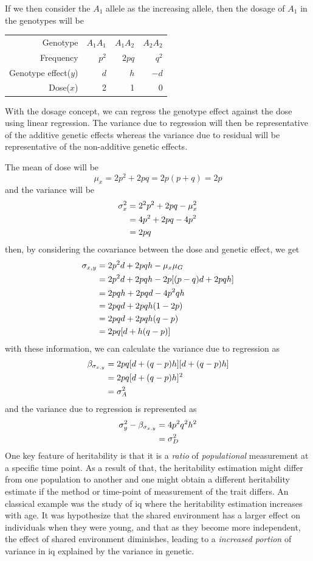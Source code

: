 \documentclass{book}
\begin{document}
	If we then consider the $A_1$ allele as the increasing allele, then the dosage of $A_1$ in the genotypes will be
	\begin{table}[H]
		\centering
		\begin{tabular}{rrrr}
			Genotype &$A_1A_1$&	$A_1A_2$&$A_2A_2$\\
			Frequency& $p^2$&$2pq$&$q^2$\\
			Genotype effect($y$)& $d$&$h$&$-d$\\
			Dose($x$)& 2 & 1 & 0
		\end{tabular}
	\end{table} 
	With the dosage concept, we can regress the genotype effect against the dose using linear regression.
	The variance due to regression will then be representative of the additive genetic effects whereas the variance due to residual will be representative of the non-additive genetic effects.
	
	The mean of dose will be
	$$
	\mu_x = 2p^2+2pq = 2p(p+q)=2p 
	$$	
	and the variance will be
	\begin{align}
	\sigma_x^2&=2^2p^2+2pq-\mu_x^2\notag\\
	&=4p^2+2pq-4p^2\notag\\
	&=2pq
	\end{align}
	then, by considering the covariance between the dose and genetic effect, we get
	\begin{align}
	\sigma_{x,y}&= 2p^2d+2pqh-\mu_x\mu_G \notag\\
	&=2p^2d+2pqh-2p[(p-q)d+2pqh]\notag\\
	&=2pqh+2pqd-4p^2qh\notag\\
	&=2pqd+2pqh(1-2p)\notag\\
	&=2pqd+2pqh(q-p)\notag\\
	&=2pq[d+h(q-p)]
	\end{align}
	with these information, we can calculate the variance due to regression as
	\begin{align}
	\beta_{\sigma_{x,y}} &= 2pq[d+(q-p)h][d+(q-p)h] \notag\\
	&=2pq[d+(q-p)h]^2\notag\\
	&=\sigma_A^2
	\end{align}
	and the variance due to regression is represented as
	\begin{align}
	\sigma_y^2-\beta_{\sigma_{x,y}} &= 4p^2q^2h^2\notag\\
	&= \sigma_D^2
	\end{align}
	One key feature of heritability is that it is a \emph{ratio} of \emph{populational} measurement at a specific time point.
	As a result of that, the heritability estimation might differ from one population to another and one might obtain a different heritability estimate if the method or time-point of measurement of the trait differs.
	An classical example was the study of \gls{iq} where the heritability estimation increases with age\citep{Bouchard2013}.
	It was hypothesize that the shared environment has a larger effect on individuals when they were young, and that as they become more independent, the effect of shared environment diminishes, leading to a \emph{increased portion} of variance in \gls{iq} explained by the variance in genetic\citep{Bouchard2013}. 
	
\end{document}
